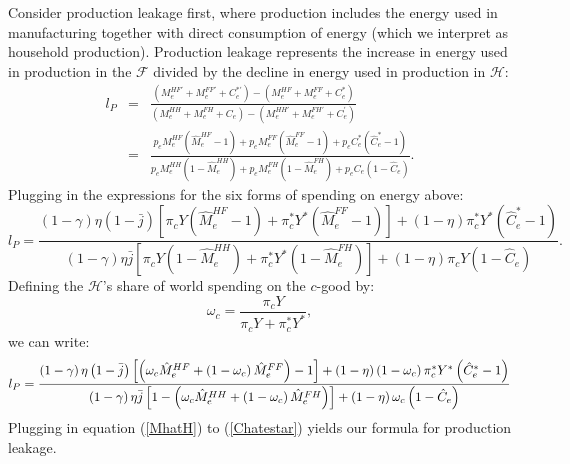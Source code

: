 \documentclass[notitlepage,12pt]{article}
\begin{document}
Consider production leakage first, where production includes the energy used
in manufacturing together with direct consumption of energy (which we
interpret as household production). Production leakage represents the
increase in energy used in production in the $\mathcal{F}$ divided by the
decline in energy used in production in $\mathcal{H}$:%
\begin{eqnarray*}
l_{P} &=&\frac{\left( M_{e}^{HF\prime }+M_{e}^{FF\prime }+C_{e}^{\ast \prime
}\right) -\left( M_{e}^{HF}+M_{e}^{FF}+C_{e}^{\ast }\right) }{\left(
M_{e}^{HH}+M_{e}^{FH}+C_{e}\right) -\left( M_{e}^{HH\prime }+M_{e}^{FH\prime
}+C_{e}^{\prime }\right) } \\
&=&\frac{p_{e}M_{e}^{HF}\left( \hat{M}_{e}^{HF}-1\right)
+p_{e}M_{e}^{FF}\left( \hat{M}_{e}^{FF}-1\right) +p_{e}C_{e}^{\ast }\left( 
\hat{C}_{e}^{\ast }-1\right) }{p_{e}M_{e}^{HH}\left( 1-\hat{M}%
_{e}^{HH}\right) +p_{e}M_{e}^{FH}\left( 1-\hat{M}_{e}^{FH}\right)
+p_{e}C_{e}\left( 1-\hat{C}_{e}\right) }.
\end{eqnarray*}%
Plugging in the expressions for the six forms of spending on energy above:%
\begin{equation*}
l_{P}=\frac{\left( 1-\gamma \right) \eta \left( 1-\bar{j}\right) \left[ \pi
_{c}Y\left( \hat{M}_{e}^{HF}-1\right) +\pi _{c}^{\ast }Y^{\ast }\left( \hat{M%
}_{e}^{FF}-1\right) \right] +\left( 1-\eta \right) \pi _{c}^{\ast }Y^{\ast
}\left( \hat{C}_{e}^{\ast }-1\right) }{\left( 1-\gamma \right) \eta \bar{j}%
\left[ \pi _{c}Y\left( 1-\hat{M}_{e}^{HH}\right) +\pi _{c}^{\ast }Y^{\ast
}\left( 1-\hat{M}_{e}^{FH}\right) \right] +\left( 1-\eta \right) \pi
_{c}Y\left( 1-\hat{C}_{e}\right) }.
\end{equation*}%
Defining the $\mathcal{H}$'s share of world spending on the $c$-good by:%
\begin{equation*}
\omega _{c}=\frac{\pi _{c}Y}{\pi _{c}Y+\pi _{c}^{\ast }Y^{\ast }},
\end{equation*}%
we can write:%
\begin{equation*}
l_{P}=\frac{\left( 1-\gamma \right) \eta \left( 1-\bar{j}\right) \left[
\left( \omega _{c}\hat{M}_{e}^{HF}+\left( 1-\omega _{c}\right) \hat{M}%
_{e}^{FF}\right) -1\right] +\left( 1-\eta \right) \left( 1-\omega
_{c}\right) \pi _{c}^{\ast }Y^{\ast }\left( \hat{C}_{e}^{\ast }-1\right) }{%
\left( 1-\gamma \right) \eta \bar{j}\left[ 1-\left( \omega _{c}\hat{M}%
_{e}^{HH}+\left( 1-\omega _{c}\right) \hat{M}_{e}^{FH}\right) \right]
+\left( 1-\eta \right) \omega _{c}\left( 1-\hat{C}_{e}\right) }
\end{equation*}%
Plugging in equation (\ref{MhatH}) to (\ref{Chatestar}) yields our formula
for production leakage.
\end{document}
